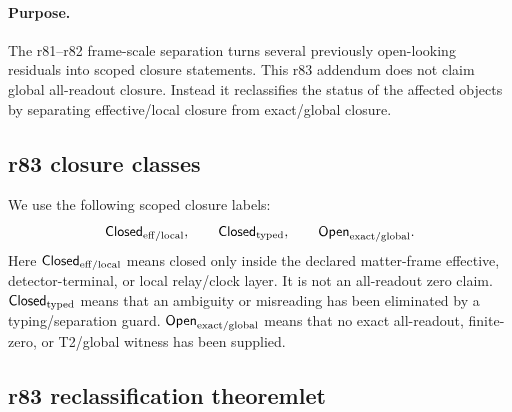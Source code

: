 \paragraph{Purpose.}
The r81--r82 frame-scale separation turns several previously open-looking residuals into
scoped closure statements.  This r83 addendum does not claim global all-readout closure.
Instead it reclassifies the status of the affected objects by separating effective/local
closure from exact/global closure.

\subsection*{r83 closure classes}
\label{subsec:r83-closure-classes}

We use the following scoped closure labels:
\[
\mathsf{Closed}_{\rm eff/local},
\qquad
\mathsf{Closed}_{\rm typed},
\qquad
\mathsf{Open}_{\rm exact/global}.
\]
Here \(\mathsf{Closed}_{\rm eff/local}\) means closed only inside the declared
matter-frame effective, detector-terminal, or local relay/clock layer.  It is not an
all-readout zero claim.  \(\mathsf{Closed}_{\rm typed}\) means that an ambiguity or
misreading has been eliminated by a typing/separation guard.  \(\mathsf{Open}_{\rm
exact/global}\) means that no exact all-readout, finite-zero, or T2/global witness has
been supplied.

\subsection*{r83 reclassification theoremlet}
\label{subsec:r83-reclassification-theoremlet}

